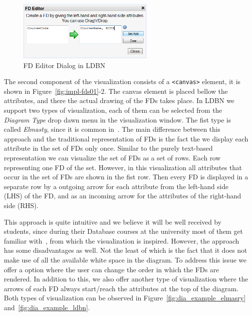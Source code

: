 \begin{figure}[h]
	\begin{center}
		\includegraphics[width=0.6\textwidth]{./img/fdeditor.png}
		\caption{FD Editor Dialog in LDBN}
		\label{fig:fdeditor}
	\end{center}
\end{figure}

The second component of the visualization consists of a \verb=<canvas>= element, 
it is shown in Figure~\ref{fig:impl-fds01}-2.
The canvas element is placed bellow the attributes, and there the actual drawing 
of the FDs takes place. In LDBN we support two types of visualization, each of them can be selected
from the \emph{Diagram Type} drop dawn menu in the visualization window. The fist type is called 
\emph{Elmasty}, since it is common in~\cite{bdb1}. The main difference between this approach and
the traditional representation of FDs is the fact the we display each attribute in the set of 
FDs only once. 
Similar to the purely text-based representation we can visualize the set
of FDs as a set of rows. Each row representing one FD of the set. 
However, in this visualization all attributes that occur in the set of FDs
are shown in the fist row. Then every FD is displayed in a separate row by a outgoing 
arrow for each attribute from the left-hand side (LHS) of the FD,
and as an incoming arrow for the attributes of the right-hand side (RHS).

This approach is quite intuitive and we believe it will be well received by
students, since during their Database courses at the university most of 
them get familiar with~\cite{bdb1}, from which
the visualization is inspired. However, the approach has some disadvantages
as well. Not the least of which is the fact that it does not make use
of all the available white space in the diagram. To address this issue
we offer a option where the user can change the order in which
the FDs are rendered. In addition to this, we also offer another type of
visualization where the arrows of each FD always start/reach the 
attributes at the top of the diagram. 
Both types of visualization can be observed in 
Figure~\ref{fig:dia_example_elmasry} and~\ref{fig:dia_example_ldbn}.


